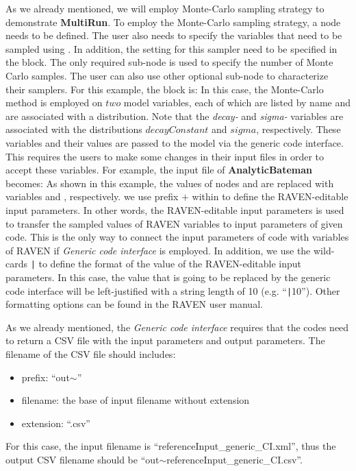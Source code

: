 As we already mentioned, we will employ Monte-Carlo sampling strategy to demonstrate \textbf{MultiRun}.
To employ the Monte-Carlo sampling strategy, a  node needs to be defined.
The user also needs to specify the variables that need to be sampled using . In addition,
the setting for this sampler need to be specified in the  block. The only required sub-node
 is used to specify the number of Monte Carlo samples. The user can also use other optional sub-node
to characterize their samplers. For this example, the  block is:
In this case, the Monte-Carlo method is employed on $two$ model variables, each of which are listed by name and
are associated with a distribution. Note that the \textit{decay-\*} and \textit{sigma-\*} variables are
associated with the distributions $decayConstant$ and $sigma$, respectively. These variables and their values are
passed to the model via the generic code interface. This requires the users to make some changes in their input files
in order to accept these variables. For example, the input file of \textbf{AnalyticBateman} becomes:
As shown in this example, the values of nodes  and  are replaced with variables
 and , respectively. \nb we use prefix 
$+$  within \xmlString{\$ \$} to define the
RAVEN-editable input parameters. In other words, the RAVEN-editable input parameters is used to transfer the sampled values
of RAVEN variables to input parameters of given code. This is the only way to connect the input parameters of code
with variables of RAVEN if \textit{Generic code interface} is employed. In addition, we use the wild-cards \texttt{|}
to define the format of the value of the RAVEN-editable input parameters. In this case, the value that is going to
be replaced by the generic code interface will be left-justified with a string length of 10 (e.g. ``\texttt{|}10''). Other
formatting options can be found in the RAVEN user manual.

As we already mentioned, the \textit{Generic code interface} requires that the codes need to return a CSV file with
the input parameters and output parameters. The filename of the CSV file should includes:
\begin{itemize}
  \item prefix: ``out$\mathtt{\sim}$''
  \item filename: the base of input filename without extension
  \item extension: ``.csv''
\end{itemize}
For this case, the input filename is ``referenceInput\_generic\_CI.xml'', thus the output CSV filename should be
``out$\mathtt{\sim}$referenceInput\_generic\_CI.csv''.

